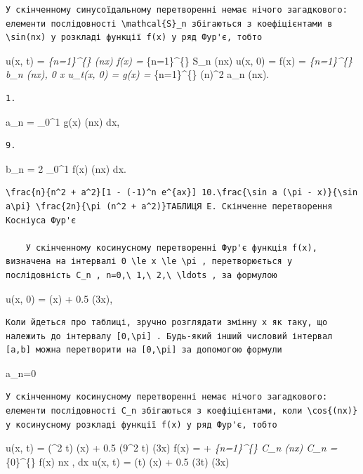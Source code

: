 \documentclass[
  ukrainian,
]{article}
\begin{document}
\begin{verbatim}
У скінченному синусоїдальному перетворенні немає нічого загадкового: елементи послідовності \mathcal{S}_n збігаються з коефіцієнтами в \sin(nx) у розкладі функції f(x) у ряд Фур'є, тобто
\end{verbatim}

u(x, t) = \sum\emph{\{n=1\}\^{}\{\infty\}
 \sin(n\pi x) f(x)
= \sum}\{n=1\}\^{}\{\infty\} S\_n \sin(nx) u(x, 0) = f(x) =
\sum\emph{\{n=1\}\^{}\{\infty\} b\_n \sin(n\pi x), 0 \le x \le \pi
u\_t(x, 0) = g(x) = \sum}\{n=1\}\^{}\{\infty\} (n\pi)\^{}2 a\_n
\sin(n\pi x).

\begin{verbatim}
1.
\end{verbatim}

a\_n =  \int\_0\^{}1 g(x) \sin(n\pi x) dx,

\begin{verbatim}
9.
\end{verbatim}

b\_n = 2 \int\_0\^{}1 f(x) \sin(n\pi x) dx.

\begin{verbatim}
\frac{n}{n^2 + a^2}[1 - (-1)^n e^{ax}] 10.\frac{\sin a (\pi - x)}{\sin a\pi} \frac{2n}{\pi (n^2 + a^2)}ТАБЛИЦЯ E. Скінченне перетворення Косніуса Фур'є

    У скінченному косинусному перетворенні Фур'є функція f(x), визначена на інтервалі 0 \le x \le \pi , перетворюється у послідовність C_n , n=0,\ 1,\ 2,\ \ldots , за формулою
\end{verbatim}

u(x, 0) = \sin(\pi x) + 0.5 \sin(3\pi x),

\begin{verbatim}
Коли йдеться про таблиці, зручно розглядати змінну x як таку, що належить до інтервалу [0,\pi] . Будь-який інший числовий інтервал [a,b] можна перетворити на [0,\pi] за допомогою формули
\end{verbatim}

a\_n=0

\begin{verbatim}
У скінченному косинусному перетворенні немає нічого загадкового: елементи послідовності C_n збігаються з коефіцієнтами, коли \cos{(nx)} у косинусному розкладі функції f(x) у ряд Фур'є, тобто
\end{verbatim}

u(x, t) = \cos(\pi\^{}2 t) \sin(\pi x) + 0.5 \cos(9\pi\^{}2 t)
\sin(3\pi x) f(x) =  + \sum\emph{\{n=1\}\^{}\{\infty\} C\_n
\cos(nx) \qquad C\_n =  \int}\{0\}\^{}\{\pi\} f(x) \cos nx
, dx u(x, t) = \cos(\pi t) \sin(\pi x) + 0.5 \cos(3\pi t) \sin(3\pi x)
\end{document}
